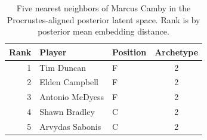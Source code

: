 \begin{table}[htbp]
  \centering\small
  \begin{tabular}{rllc}
    \toprule
    Rank & Player & Position & Archetype \\
    \midrule
    1 & Tim Duncan & F & 2 \\
    2 & Elden Campbell & F & 2 \\
    3 & Antonio McDyess & F & 2 \\
    4 & Shawn Bradley & C & 2 \\
    5 & Arvydas Sabonis & C & 2 \\
    \bottomrule
  \end{tabular}
  \caption{Five nearest neighbors of Marcus Camby in the Procrustes-aligned posterior latent space. Rank is by posterior mean embedding distance.}
  \label{tab:Marcus_Camby_neighbors}
\end{table}

